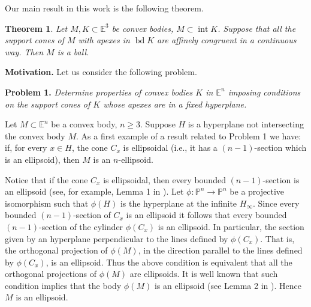\documentclass[12pt]{amsart}
\newcommand{\inte}{\operatorname*{int}}
\newcommand{\bd}{\operatorname*{bd}}
\newtheorem{theorem}{Theorem}
\begin{document}
Our main  result in this work is the following theorem.
\begin{theorem}\label{marisol}
Let $M,K\subset \mathbb{E}^{3}$ be convex bodies, $M\subset \inte K$. Suppose that all the support cones of $M$ with apexes in $\bd K$ are affinely congruent in a continuous way. Then $M$ is a ball.
\end{theorem}

 
           
\textbf{Motivation.} Let us consider the following problem.

\textbf{Problem 1.} \textit{Determine properties of convex bodies $K$ in $\mathbb{E}^n$ imposing conditions on the  support cones of $K$ whose apexes are in a fixed hyperplane.}

Let $M\subset \mathbb{E}^n$ be a convex body, $n\geq 3$. Suppose $H$ is a hyperplane not intersecting the convex body $M$. As a first example of a result related to Problem 1 we have: if, for every $x \in H$, the cone $C_x$ is ellipsoidal (i.e., it has a $(n-1)$-section which is an ellipsoid), then $M$ is an $n$-ellipsoid. 

Notice that if the cone $C_x$ is ellipsoidal, then every bounded  $(n-1)$-section  is an ellipsoid (see, for example, Lemma 1 in \cite{egj}). Let $\phi:\mathbb{P}^n \rightarrow \mathbb{P}^n$ be a projective isomorphism such that $\phi(H)$ is the hyperplane at the infinite $H_{ \infty}$. Since every bounded  $(n-1)$-section of $C_x$ is an ellipsoid it follows that every bounded  $(n-1)$-section of the cylinder $\phi(C_x)$ is an ellipsoid. In particular, the section given by an hyperplane perpendicular to the lines defined by $\phi(C_x)$. That is, the orthogonal projection of $\phi(M)$, in the direction parallel to the lines defined by $\phi(C_x)$, is an ellipsoid. Thus the above condition is equivalent that all the orthogonal projections of $\phi(M)$ are ellipsoids. It is well known that such condition implies that the body $\phi(M)$ is an ellipsoid (see Lemma 2 in \cite{Chakerian}). Hence $M$ is an ellipsoid.
\end{document}
